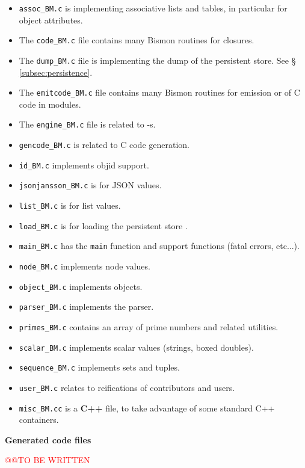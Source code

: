 \begin{itemize}
  \item \texttt{assoc\_BM.c} is implementing associative lists and
    tables,    in
    particular for object attributes.

  \item The \texttt{code\_BM.c} file contains many Bismon routines for
     closures.

  \item The \texttt{dump\_BM.c} file is implementing the  dump of the
      persistent store.   See \S
      \ref{subsec:persistence}.

  \item The \texttt{emitcode\_BM.c} file contains many Bismon routines
    for  emission or  of C code in
     modules.
  \item The \texttt{engine\_BM.c} file is related to -s.

  \item \texttt{gencode\_BM.c} is related to C code generation.

  \item \texttt{id\_BM.c} implements objid support.

  \item \texttt{jsonjansson\_BM.c} is for JSON values.

  \item \texttt{list\_BM.c} is for list values.

  \item \texttt{load\_BM.c} is for loading the persistent store
   .

  \item \texttt{main\_BM.c} has the \texttt{main} function and support functions (fatal errors, etc...).

  \item \texttt{node\_BM.c} implements node values.

  \item \texttt{object\_BM.c} implements objects.

  \item \texttt{parser\_BM.c} implements the parser.

  \item \texttt{primes\_BM.c} contains an array of prime numbers and related utilities.

  \item \texttt{scalar\_BM.c} implements scalar values (strings, boxed doubles).

  \item \texttt{sequence\_BM.c} implements sets and tuples.

  \item \texttt{user\_BM.c} relates to reifications of contributors and
  users.

  \item \texttt{misc\_BM.cc} is a \textbf{C++} file, to take advantage of some standard C++ containers.
\end{itemize}

{\large \textbf{Generated  code files}}

{\textcolor{red}{\large @@TO BE WRITTEN}}
